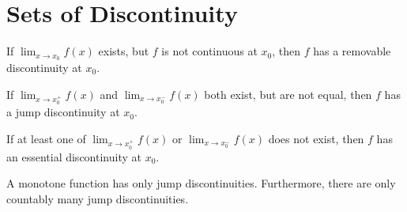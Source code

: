
\section{Sets of Discontinuity}


\begin{definition}
    If $\lim_{x\to x_0} f(x)$ exists, but $f$ is not continuous at $x_0$, then $f$ has a removable discontinuity at $x_0$.
\end{definition}

\begin{definition}
    If $\lim_{x\to x_0^+} f(x)$ and $\lim_{x\to x_0^-} f(x)$ both exist, but are not equal, then $f$ has a jump discontinuity at $x_0$.
\end{definition}

\begin{definition}
    If at least one of $\lim_{x\to x_0^+} f(x)$ or $\lim_{x\to x_0^-} f(x)$ does not exist, then $f$ has an essential discontinuity at $x_0$.
\end{definition}

\begin{theorem*}{
    A monotone function has only jump discontinuities.
    Furthermore, there are only countably many jump discontinuities.
}
\end{theorem*}
